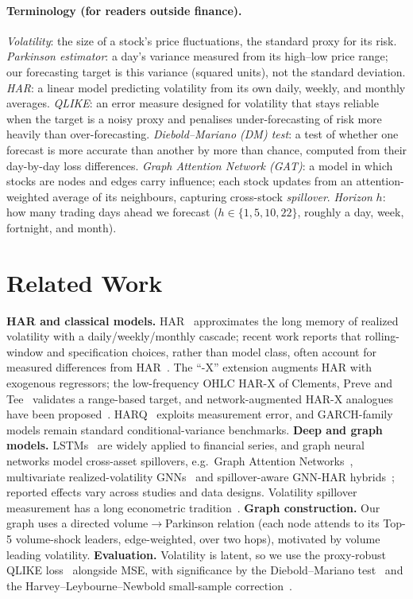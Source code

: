 \documentclass[runningheads]{llncs}
\begin{document}
\paragraph{Terminology (for readers outside finance).}
\emph{Volatility}: the size of a stock's price fluctuations, the standard proxy for its risk.
\emph{Parkinson estimator}: a day's variance measured from its high--low price range; our
forecasting target is this variance (squared units), not the standard deviation.
\emph{HAR}: a linear model predicting volatility from its own daily, weekly, and monthly averages.
\emph{QLIKE}: an error measure designed for volatility that stays reliable when the target is a noisy
proxy and penalises under-forecasting of risk more heavily than over-forecasting.
\emph{Diebold--Mariano (DM) test}: a test of whether one forecast is more accurate than another by
more than chance, computed from their day-by-day loss differences.
\emph{Graph Attention Network (GAT)}: a model in which stocks are nodes and edges carry influence;
each stock updates from an attention-weighted average of its neighbours, capturing cross-stock
\emph{spillover}.
\emph{Horizon} $h$: how many trading days ahead we forecast ($h\in\{1,5,10,22\}$, roughly a day,
week, fortnight, and month).

\section{Related Work}
\textbf{HAR and classical models.} HAR~\cite{corsi2009} approximates the long memory of realized
volatility with a daily/weekly/monthly cascade; recent work reports that rolling-window and
specification choices, rather than model class, often account for measured differences from
HAR~\cite{audrino2025}. The ``-X'' extension augments HAR with exogenous regressors; the low-frequency
OHLC HAR-X of Clements, Preve and Tee~\cite{clements2024} validates a range-based target, and
network-augmented HAR-X analogues have been proposed~\cite{gnarharx2025}. HARQ~\cite{harq2016}
exploits measurement error, and GARCH-family models remain standard conditional-variance benchmarks.
\textbf{Deep and graph models.} LSTMs~\cite{lstm1997} are widely applied to financial series, and
graph neural networks model cross-asset spillovers, e.g.\ Graph Attention Networks~\cite{gat2018},
multivariate realized-volatility GNNs~\cite{chen2022} and spillover-aware GNN-HAR
hybrids~\cite{gnnhar2025}; reported effects vary across studies and data designs. Volatility spillover
measurement has a long econometric tradition~\cite{dy2012}. \textbf{Graph construction.} Our graph
uses a directed volume$\to$Parkinson relation (each node attends to its Top-5 volume-shock leaders,
edge-weighted, over two hops), motivated by volume leading volatility. \textbf{Evaluation.}
Volatility is latent, so we use the proxy-robust QLIKE loss~\cite{patton2011} alongside MSE, with
significance by the Diebold--Mariano test~\cite{dm1995} and the Harvey--Leybourne--Newbold
small-sample correction~\cite{hln1997}.
\end{document}
